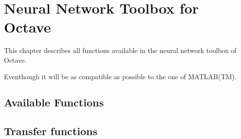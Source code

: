 \chapter{Neural Network Toolbox for Octave}
This chapter describes all functions available in the neural network toolbox of Octave.

Eventhough it will be as compatible as possible to the one of MATLAB(TM).

\section{Available Functions}







\section{Transfer functions}




